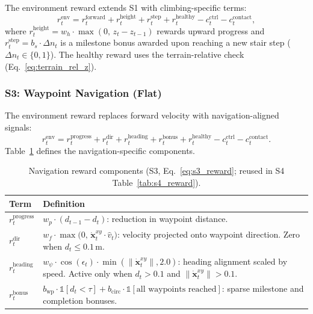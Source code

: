 \documentclass[conference]{IEEEtran}
\begin{document}
The environment reward extends S1 with climbing-specific terms:
\begin{equation}
\label{eq:s2_reward}
r_t^{\mathrm{env}} = r_t^{\mathrm{forward}} + r_t^{\mathrm{height}} + r_t^{\mathrm{step}} + r_t^{\mathrm{healthy}} - c_t^{\mathrm{ctrl}} - c_t^{\mathrm{contact}},
\end{equation}
where $r_t^{\mathrm{height}} = w_h \cdot \max(0,\, z_t - z_{t-1})$ rewards upward progress and $r_t^{\mathrm{step}} = b_s \cdot \Delta n_t$ is a milestone bonus awarded upon reaching a new stair step ($\Delta n_t \in \{0,1\}$). The healthy reward uses the terrain-relative check (Eq.~\ref{eq:terrain_rel_z}).


\subsubsection{S3: Waypoint Navigation (Flat)}

The environment reward replaces forward velocity with navigation-aligned signals:
\begin{equation}
\label{eq:s3_reward}
r_t^{\mathrm{env}} = r_t^{\mathrm{progress}} + r_t^{\mathrm{dir}} + r_t^{\mathrm{heading}} + r_t^{\mathrm{bonus}} + r_t^{\mathrm{healthy}} - c_t^{\mathrm{ctrl}} - c_t^{\mathrm{contact}}.
\end{equation}
Table~\ref{tab:reward_nav} defines the navigation-specific components.

\begin{table}[h!]
\caption{Navigation reward components (S3, Eq.~\ref{eq:s3_reward}; reused in S4 Table~\ref{tab:s4_reward}).}
\label{tab:reward_nav}
\centering
\small
\renewcommand{\arraystretch}{1.3}
\begin{tabular}{@{}p{1.4cm}p{5.8cm}@{}}
\toprule
\textbf{Term} & \textbf{Definition} \\
\midrule
$r_t^{\mathrm{progress}}$ & $w_p \cdot (d_{t-1} - d_t)$: reduction in waypoint distance. \\[2pt]
$r_t^{\mathrm{dir}}$ & $w_f \cdot \max\!\big(0,\, \dot{\mathbf{x}}^{xy}_t \!\cdot\! \hat{v}_t\big)$: velocity projected onto waypoint direction. Zero when $d_t \leq 0.1\,$m. \\[2pt]
$r_t^{\mathrm{heading}}$ & $w_\psi \cdot \cos(\epsilon_t) \cdot \min(\|\dot{\mathbf{x}}^{xy}_t\|, 2.0)$: heading alignment scaled by speed. Active only when $d_t > 0.1$ and $\|\dot{\mathbf{x}}^{xy}_t\| > 0.1$. \\[2pt]
$r_t^{\mathrm{bonus}}$ & $b_{\mathrm{wp}} \cdot \mathbb{1}[d_t < \tau] + b_{\mathrm{circ}} \cdot \mathbb{1}[\text{all waypoints reached}]$: sparse milestone and completion bonuses. \\
\bottomrule
\end{tabular}
\end{table}
\end{document}
